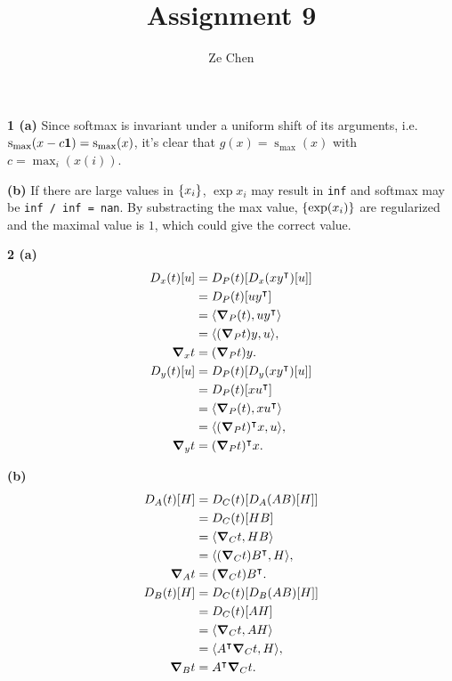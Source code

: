 \documentclass{article}
\title{Assignment 9}
\author{Ze Chen}
\makeatletter
\newcommand*{\shifttext}[1]{%
  \settowidth{\@tempdima}{#1}%
  \hspace{-\@tempdima}#1%
}
\newcommand{\plabel}[1]{%
\shifttext{\textbf{#1}\quad}%
}
\newcommand{\prule}{%
\begin{center}%
\hdashrule[0.5ex]{.99\linewidth}{1pt}{1pt 2.5pt}%
\end{center}%
}
\newcommand{\minusbaseline}{\abovedisplayskip=0pt\abovedisplayshortskip=0pt~\vspace*{-\baselineskip}}%
\makeatother
\begin{document}
\maketitle

\plabel{1 (a)}%
Since softmax is invariant under a uniform shift of its arguments, i.e. $\operatorname{s}_{\max}(x - c\vb{1}) = \operatorname{s}_{\max}(x)$, it's clear that $g(x) = \operatorname{s}_{\max}(x)$ with $c = \max_i(x(i))$.

\plabel{(b)}%
If there are large values in $\qty{x_i}$, $\exp{x_i}$ may result in \texttt{inf} and softmax may be \texttt{inf / inf = nan}.
By substracting the max value, $\qty{\exp(x_i)}$ are regularized and the maximal value is $1$, which could give the correct value.

\prule

\plabel{2 (a)}%
\begingroup\minusbaseline
\begin{align*}
    D_x(t)[u] &= D_P(t)[D_x(x y^\intercal)[u]] \\
    &= D_P(t)[u y^\intercal] \\
    &= \langle \grad_P(t), u y^\intercal \rangle \\
    &= \langle (\grad_P t) y, u \rangle, \\
    \grad_x t &= (\grad_P t) y. \\
    D_y(t)[u] &= D_P(t)[D_y(x y^\intercal)[u]] \\
    &= D_P(t)[x u^\intercal] \\
    &= \langle \grad_P(t), x u^\intercal \rangle \\
    &= \langle (\grad_P t)^\intercal x, u \rangle, \\
    \grad_y t &= (\grad_P t)^\intercal x.
\end{align*}
\endgroup

\plabel{(b)}%
\begingroup\minusbaseline
\begin{align*}
    D_A (t)[H] &= D_C(t)[D_A(AB)[H]] \\
    &= D_C(t)[HB] \\
    &= \langle \grad_C t, HB \rangle \\
    &= \langle (\grad_C t) B^\intercal, H \rangle, \\
    \grad_A t &= (\grad_C t) B^\intercal. \\
    D_B (t)[H] &= D_C(t)[D_B(AB)[H]] \\
    &= D_C(t)[AH] \\
    &= \langle \grad_C t, A H \rangle \\
    &= \langle A^\intercal \grad_C t, H \rangle, \\
    \grad_B t &= A^\intercal \grad_C t.
\end{align*}
\endgroup
\end{document}
